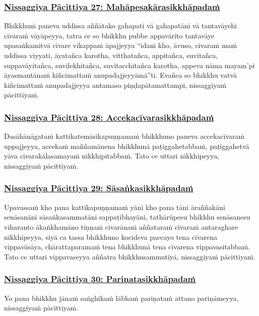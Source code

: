 \subsubsection*{\hyperref[forf-exp27]{Nissaggiya Pācittiya 27: Mahāpesakārasikkhāpadaṁ}}
\label{np27}
Bhikkhuṁ paneva uddissa aññātako gahapati vā gahapatānī vā tantavāyehi cīvaraṁ vāyāpeyya, tatra ce so bhikkhu pubbe appavārito tantavāye upasaṅkamitvā cīvare vikappaṁ āpajjeyya “idaṁ kho, āvuso, cīvaraṁ maṁ uddissa viyyati, āyatañca karotha, vitthatañca, appitañca, suvītañca, suppavāyitañca, suvilekhitañca, suvitacchitañca karotha, appeva nāma mayam'pi āyasmantānaṁ kiñcimattaṁ anupadajjeyyāmā”ti. Evañca so bhikkhu vatvā kiñcimattaṁ anupadajjeyya antamaso piṇḍapātamattampi, nissaggiyaṁ pācittiyaṁ.

\subsubsection*{\hyperref[forf-exp28]{Nissaggiya Pācittiya 28: Accekacīvarasikkhāpadaṁ}}
\label{np28}
Dasāhānāgataṁ kattikatemāsikapuṇṇamaṁ bhikkhuno paneva accekacīvaraṁ uppajjeyya, accekaṁ maññamānena bhikkhunā paṭiggahetabbaṁ, paṭiggahetvā yāva cīvarakālasamayaṁ nikkhipitabbaṁ. Tato ce uttari nikkhipeyya, nissaggiyaṁ pācittiyaṁ.

\subsubsection*{\hyperref[forf-exp29]{Nissaggiya Pācittiya 29: Sāsaṅkasikkhāpadaṁ}}
\label{np29}
Upavassaṁ kho pana kattikapuṇṇamaṁ yāni kho pana tāni āraññakāni senāsanāni sāsaṅkasammatāni sappaṭibhayāni, tathārūpesu bhikkhu senāsanesu viharanto ākaṅkhamāno tiṇṇaṁ cīvarānaṁ aññataraṁ cīvaraṁ antaraghare nikkhipeyya, siyā ca tassa bhikkhuno kocideva paccayo tena cīvarena vippavāsāya, chārattaparamaṁ tena bhikkhunā tena cīvarena vippavasitabbaṁ. Tato ce uttari vippavaseyya aññatra bhikkhusammutiyā, nissaggiyaṁ pācittiyaṁ.

\subsubsection*{\hyperref[forf-exp30]{Nissaggiya Pācittiya 30: Pariṇatasikkhāpadaṁ}}
\label{np30}
Yo pana bhikkhu jānaṁ saṅghikaṁ lābhaṁ pariṇataṁ attano pariṇāmeyya, nissaggiyaṁ pācittiyaṁ.

